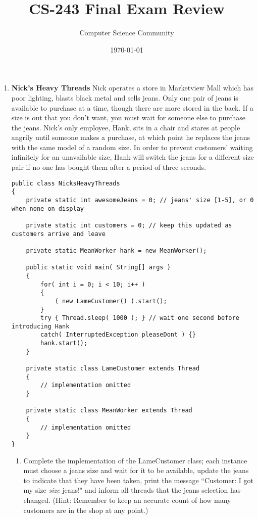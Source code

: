 \documentclass[11pt]{article}
\author{Computer Science Community}
\title{CS-243 Final Exam Review}
\date{\today}
\begin{document}
\header

\begin{enumerate}

\item {\bf Nick's Heavy Threads} Nick operates a store in Marketview Mall which
      has poor lighting, blasts black metal and sells jeans. Only one pair of
      jeans is available to purchase at a time, though there are more
      stored in the back. If a size is out that you don't want, you must wait
      for someone else to purchase the jeans. Nick's only employee, Hank, sits
      in a chair and stares at people angrily until someone makes a purchase,
      at which point he replaces the jeans with the same model of a random
      size. In order to prevent customers' waiting infinitely for an
      unavailable size, Hank will switch the jeans for a different size pair if
      no one has bought them after a period of three seconds.

\begin{lstlisting}
public class NicksHeavyThreads
{
    private static int awesomeJeans = 0; // jeans' size [1-5], or 0 when none on display
    
    private static int customers = 0; // keep this updated as customers arrive and leave
    
    private static MeanWorker hank = new MeanWorker();
    
    public static void main( String[] args )
    {
        for( int i = 0; i < 10; i++ )
        {
            ( new LameCustomer() ).start();
        }
        try { Thread.sleep( 1000 ); } // wait one second before introducing Hank
        catch( InterruptedException pleaseDont ) {}
        hank.start();
    }
    
    private static class LameCustomer extends Thread
    {
        // implementation omitted
    }
    
    private static class MeanWorker extends Thread
    {
        // implementation omitted
    }
}
\end{lstlisting}

    \begin{enumerate}
    
    \item Complete the implementation of the LameCustomer class; each instance
          must choose a jeans size and wait for it to be available, update the
          jeans to indicate that they have been taken, print the message
          ``Customer: I got my size \emph{size} jeans!" and inform all threads
          that the jeans selection has changed.  (Hint: Remember to keep an
          accurate count of how many customers are in the shop at any point.)


\end{enumerate}
\end{enumerate}
\end{document}
